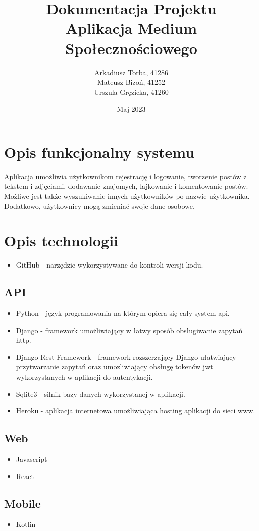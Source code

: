 \documentclass{article}
\title{Dokumentacja Projektu \\
Aplikacja Medium Społecznościowego}
\author{Arkadiusz Torba, 41286\\
Mateusz Bizoń, 41252\\
Urszula Gręzicka, 41260}
\date{Maj 2023}
\begin{document}
\maketitle


\section{Opis funkcjonalny systemu}
Aplikacja umożliwia użytkownikom rejestrację i logowanie, tworzenie postów z tekstem i zdjęciami, dodawanie znajomych, lajkowanie i komentowanie postów. Możliwe jest także wyszukiwanie innych użytkowników po nazwie użytkownika. Dodatkowo, użytkownicy mogą zmieniać swoje dane osobowe.
\section{Opis technologii}
\begin{itemize}
    \item GitHub - narzędzie wykorzystywane do kontroli wersji kodu.
\end{itemize}
\subsection{API}
\begin{itemize}
    \item Python - język programowania na którym opiera się cały system api.
    \item Django - framework umożliwiający w łatwy sposób obsługiwanie zapytań http.
    \item Django-Rest-Framework - framework rozszerzający Django ułatwiający przytwarzanie zapytań oraz umozliwiający obsługę tokenów jwt wykorzystanych w aplikacji do autentykacji.
    \item Sqlite3 - silnik bazy danych wykorzystanej w aplikacji.
    \item Heroku - aplikacja internetowa umożliwiająca hosting aplikacji do sieci www.
\end{itemize}
\subsection{Web}
\begin{itemize}
    \item Javascript
    \item React
\end{itemize}
\subsection{Mobile}
\begin{itemize}
    \item Kotlin
\end{itemize}
\end{document}
